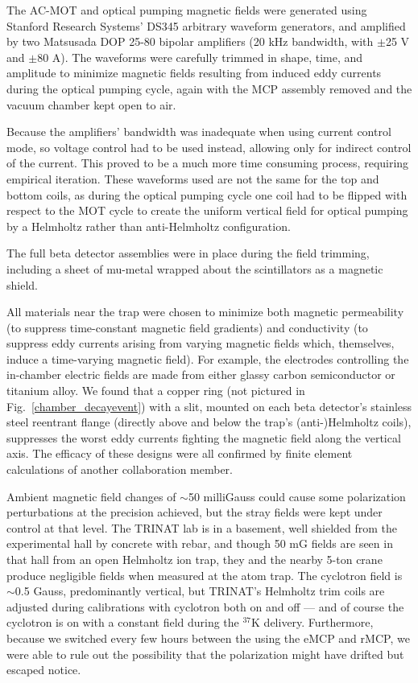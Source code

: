 The AC-MOT and optical pumping magnetic fields were generated using Stanford Research Systems' DS345 arbitrary waveform generators, and amplified by two \mbox{Matsusada} DOP 25-80 bipolar amplifiers (20 kHz bandwidth, with $\pm$25 V and $\pm$80 A).
The waveforms were carefully trimmed in shape, time, and amplitude to minimize magnetic fields resulting from induced eddy currents during the optical pumping cycle, again with the MCP assembly removed and the vacuum chamber kept open to air.

Because the amplifiers' bandwidth was inadequate when using current control mode, so voltage control had to be used instead, allowing only for indirect control of the current.  This proved to be a much more time consuming process, requiring empirical iteration.  
These waveforms used are not the same for the top and bottom coils, as during the optical pumping cycle one coil had to be flipped with respect to the MOT cycle to create the uniform vertical field for optical pumping by a Helmholtz rather than anti-Helmholtz configuration.


The full beta detector assemblies were in place during the field trimming, including a sheet of mu-metal wrapped about the scintillators as a magnetic shield.  


All materials near the trap were chosen to minimize both magnetic permeability (to suppress time-constant magnetic field gradients) and conductivity (to suppress eddy currents arising from varying magnetic fields which, themselves, induce a time-varying magnetic field).  For example, the electrodes controlling the in-chamber electric fields are made from either glassy carbon semiconductor or titanium alloy.  We found that a 
copper ring (not pictured in Fig.~\ref{chamber_decayevent}) with a slit, mounted on each beta detector's stainless steel reentrant flange (directly above and below the trap's (anti-)Helmholtz coils), suppresses the worst eddy currents fighting the magnetic field along the vertical axis. The efficacy of these designs were all confirmed by finite element calculations of another collaboration member.


Ambient magnetic field changes of $\sim$50 milliGauss could cause some polarization perturbations at the precision achieved, but the stray fields were kept under control at that level.  The TRINAT lab is in a basement, well shielded from the experimental hall by concrete with rebar, and though 50 mG fields are seen in that hall from an open Helmholtz ion trap, they and the nearby 5-ton crane produce negligible fields when measured at the atom trap. The cyclotron field is $\sim$0.5 Gauss, predominantly vertical, 
but TRINAT's Helmholtz trim coils are adjusted during calibrations with cyclotron both on and off --- and of course the cyclotron is on with a constant field during the $^{37}$K delivery.  Furthermore, because we switched every few hours between the using the eMCP and rMCP, we were able to rule out the possibility that the polarization might have drifted but escaped notice.  


